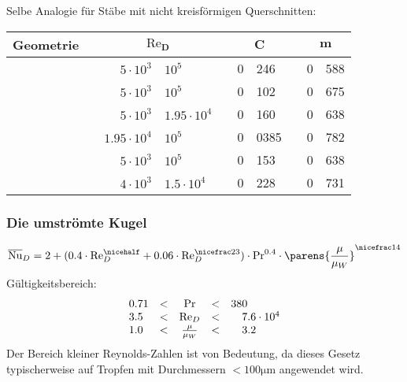 			Selbe Analogie für Stäbe mit nicht kreisförmigen Querschnitten:
			\begin{center}
				\begin{tabular}{@{}p{.6cm}@{}m{.9cm}@{}m{.15cm}cr@{$\:-\:$}lcr@{.}lcr@{.}l@{}}
					\toprule
					\multicolumn{3}{c}{\textbf{Geometrie}} && \multicolumn{2}{c}{$\boldsymbol{\mathrm{Re}_D}$} && \multicolumn{2}{c}{$\boldsymbol C$} && \multicolumn{2}{c}{$\boldsymbol m$} \\
					\midrule
					&&  && $5 \cdot 10^3$ & $10^5$ && 0&246 && 0&588 \\
					\midrule
					& &  && $5 \cdot 10^3$ & $10^5$ && 0&102 && 0&675 \\
					\midrule
					\multirow{2}{*}{}&\multirow{2}{*}{} &\multirow{2}{*}{} && $5 \cdot 10^3$ & $1.95 \cdot 10^4$ && 0&160 && 0&638 \\
					& & && $1.95 \cdot 10^4$ & $10^5$ && 0&0385 && 0&782 \\
					\midrule
					& & && $5 \cdot 10^3$ & $10^5$ && 0&153 && 0&638 \\
					\midrule
					& & && $4 \cdot 10^3$ & $1.5 \cdot 10^4$ && 0&228 && 0&731 \\
					\bottomrule
				\end{tabular}
			\end{center}


		\subsubsection{Die umströmte Kugel} %
			\[
				\overline{\mathrm{Nu}}_D = 2+(0.4 \cdot \mathrm{Re}_D^{\nicehalf} + 0.06 \cdot \mathrm{Re}_D^{\nicefrac 2 3}) \cdot \mathrm{Pr}^{0.4} \cdot \parens{\frac{\mu}{\mu_W}}^{\nicefrac 1 4}
			\]
			Gültigkeitsbereich:
			\[
				\begin{array}{r@{.}l@{\quad<\quad}c@{\quad<\quad}r@{}l}
					0&71 & \mathrm{Pr} & 380 & \\
					3&5 & \mathrm{Re}_D & 7&.6\cdot 10^4 \\
					1&0 & \frac{\mu}{\mu_W} & 3&.2
				\end{array}
			\]
			Der Bereich kleiner Reynolds-Zahlen ist von Bedeutung, da dieses Gesetz typischerweise auf Tropfen mit Durchmessern $< 100\si{\micro\metre}$ angewendet wird.
